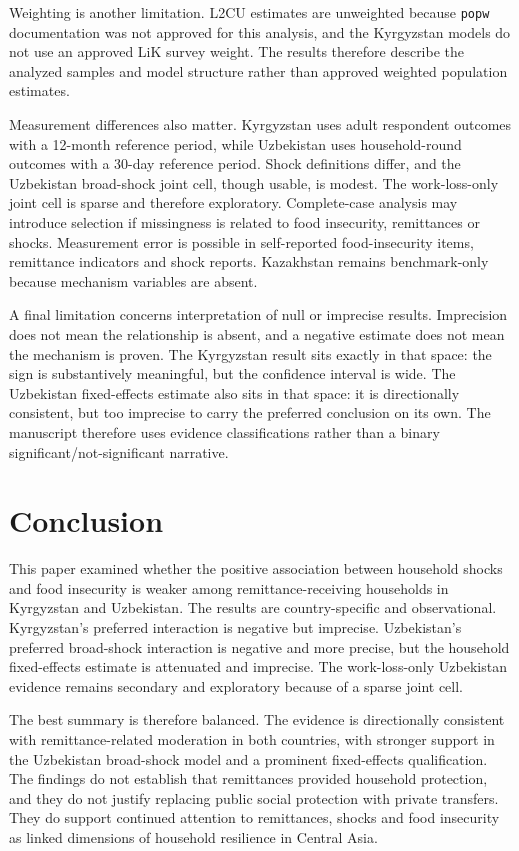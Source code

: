 \documentclass[11pt]{article}
\begin{document}
Weighting is another limitation. L2CU estimates are unweighted because \texttt{popw} documentation was not approved for this analysis, and the Kyrgyzstan models do not use an approved LiK survey weight. The results therefore describe the analyzed samples and model structure rather than approved weighted population estimates.

Measurement differences also matter. Kyrgyzstan uses adult respondent outcomes with a 12-month reference period, while Uzbekistan uses household-round outcomes with a 30-day reference period. Shock definitions differ, and the Uzbekistan broad-shock joint cell, though usable, is modest. The work-loss-only joint cell is sparse and therefore exploratory. Complete-case analysis may introduce selection if missingness is related to food insecurity, remittances or shocks. Measurement error is possible in self-reported food-insecurity items, remittance indicators and shock reports. Kazakhstan remains benchmark-only because mechanism variables are absent.

A final limitation concerns interpretation of null or imprecise results. Imprecision does not mean the relationship is absent, and a negative estimate does not mean the mechanism is proven. The Kyrgyzstan result sits exactly in that space: the sign is substantively meaningful, but the confidence interval is wide. The Uzbekistan fixed-effects estimate also sits in that space: it is directionally consistent, but too imprecise to carry the preferred conclusion on its own. The manuscript therefore uses evidence classifications rather than a binary significant/not-significant narrative.

\section{Conclusion}

This paper examined whether the positive association between household shocks and food insecurity is weaker among remittance-receiving households in Kyrgyzstan and Uzbekistan. The results are country-specific and observational. Kyrgyzstan's preferred interaction is negative but imprecise. Uzbekistan's preferred broad-shock interaction is negative and more precise, but the household fixed-effects estimate is attenuated and imprecise. The work-loss-only Uzbekistan evidence remains secondary and exploratory because of a sparse joint cell.

The best summary is therefore balanced. The evidence is directionally consistent with remittance-related moderation in both countries, with stronger support in the Uzbekistan broad-shock model and a prominent fixed-effects qualification. The findings do not establish that remittances provided household protection, and they do not justify replacing public social protection with private transfers. They do support continued attention to remittances, shocks and food insecurity as linked dimensions of household resilience in Central Asia.
\end{document}
